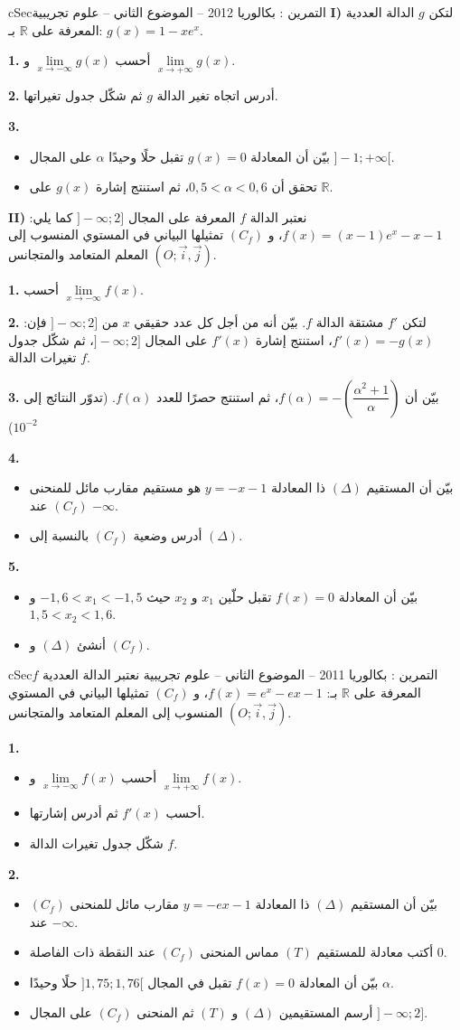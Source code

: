 \documentclass[12pt,a4paper]{article}
\newenvironment{BOX}[2]{\begin{otherlanguage}{english}\begin{arbox}{#1}{#2}}{\end{arbox}\end{otherlanguage}}
\newcounter{exo}
\newenvironment{tamrin}[1]{\stepcounter{exo}\begin{BOX}{cSec}{التمرين \theexo: #1}}{\end{BOX}}
\newcommand{\R}{\mathbb{R}}
\newenvironment{sq}{\begin{itemize}[leftmargin=2.4em,itemsep=3pt]}{\end{itemize}}
\newcommand{\qa}{\item[(أ)]}\newcommand{\qb}{\item[(ب)]}\newcommand{\qc}{\item[(جـ)]}\newcommand{\qd}{\item[(د)]}\newcommand{\qe}{\item[(هـ)]}
\newcommand{\QQ}[1]{\par\smallskip\textbf{#1.} }
\begin{document}
\begin{tamrin}{بكالوريا 2012 -- الموضوع الثاني -- علوم تجريبية}
\textbf{I)} لتكن $g$ الدالة العددية المعرفة على $\R$ بـ: $g(x)=1-xe^x$.

\QQ{1} أحسب $\lim\limits_{x\to-\infty}g(x)$ و $\lim\limits_{x\to+\infty}g(x)$.
\QQ{2} أدرس اتجاه تغير الدالة $g$ ثم شكّل جدول تغيراتها.
\QQ{3}
\begin{sq}
\qa بيّن أن المعادلة $g(x)=0$ تقبل حلًا وحيدًا $\alpha$ على المجال $]-1;+\infty[$.
\qb تحقق أن $0{,}5<\alpha<0{,}6$، ثم استنتج إشارة $g(x)$ على $\R$.
\end{sq}

\textbf{II)} نعتبر الدالة $f$ المعرفة على المجال $]{-}\infty;2]$ كما يلي: $f(x)=(x-1)e^x-x-1$، و $(C_f)$ تمثيلها البياني في المستوي المنسوب إلى المعلم المتعامد والمتجانس $(O;\vec i,\vec j)$.

\QQ{1} أحسب $\lim\limits_{x\to-\infty}f(x)$.
\QQ{2} لتكن $f'$ مشتقة الدالة $f$. بيّن أنه من أجل كل عدد حقيقي $x$ من $]{-}\infty;2]$ فإن: $f'(x)=-g(x)$، استنتج إشارة $f'(x)$ على المجال $]{-}\infty;2]$، ثم شكّل جدول تغيرات الدالة $f$.
\QQ{3} بيّن أن $f(\alpha)=-\left(\dfrac{\alpha^2+1}{\alpha}\right)$، ثم استنتج حصرًا للعدد $f(\alpha)$. (تدوّر النتائج إلى $10^{-2}$)
\QQ{4}
\begin{sq}
\qa بيّن أن المستقيم $(\Delta)$ ذا المعادلة $y=-x-1$ هو مستقيم مقارب مائل للمنحنى $(C_f)$ عند $-\infty$.
\qb أدرس وضعية $(C_f)$ بالنسبة إلى $(\Delta)$.
\end{sq}
\QQ{5}
\begin{sq}
\qa بيّن أن المعادلة $f(x)=0$ تقبل حلّين $x_1$ و $x_2$ حيث $-1{,}6<x_1<-1{,}5$ و $1{,}5<x_2<1{,}6$.
\qb أنشئ $(\Delta)$ و $(C_f)$.
\end{sq}
\end{tamrin}

\begin{tamrin}{بكالوريا 2011 -- الموضوع الثاني -- علوم تجريبية}
نعتبر الدالة العددية $f$ المعرفة على $\R$ بـ: $f(x)=e^x-ex-1$، و $(C_f)$ تمثيلها البياني في المستوي المنسوب إلى المعلم المتعامد والمتجانس $(O;\vec i,\vec j)$.

\QQ{1}
\begin{sq}
\qa أحسب $\lim\limits_{x\to-\infty}f(x)$ و $\lim\limits_{x\to+\infty}f(x)$.
\qb أحسب $f'(x)$ ثم أدرس إشارتها.
\qc شكّل جدول تغيرات الدالة $f$.
\end{sq}
\QQ{2}
\begin{sq}
\qa بيّن أن المستقيم $(\Delta)$ ذا المعادلة $y=-ex-1$ مقارب مائل للمنحنى $(C_f)$ عند $-\infty$.
\qb أكتب معادلة للمستقيم $(T)$ مماس المنحنى $(C_f)$ عند النقطة ذات الفاصلة $0$.
\qc بيّن أن المعادلة $f(x)=0$ تقبل في المجال $]1{,}75;1{,}76[$ حلًا وحيدًا $\alpha$.
\qd أرسم المستقيمين $(\Delta)$ و $(T)$ ثم المنحنى $(C_f)$ على المجال $]{-}\infty;2]$.
\end{sq}
\end{tamrin}
\end{document}
